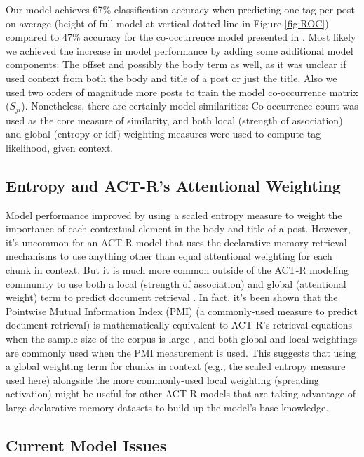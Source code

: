 \documentclass[10pt,letterpaper]{article}
\begin{document}
Our model achieves 67\% classification accuracy when predicting one tag per post on average
(height of full model at vertical dotted line in Figure \ref{fig:ROC})
compared to 47\% accuracy for the co-occurrence model presented in .
Most likely we achieved the increase in model performance by adding some additional model components:
The offset and possibly the body term as well,
as it was unclear if \citeauthor{Kuo2011} used context from both the body and title of a post or just the title.
Also we used two orders of magnitude more posts to train the model co-occurrence matrix ($S_{ji}$).
Nonetheless, there are certainly model similarities:
Co-occurrence count was used as the core measure of similarity, and both local (strength of association) and global (entropy or idf) weighting measures were used to compute tag likelihood, given context.

\subsection{Entropy and ACT-R's Attentional Weighting}

Model performance improved by using a scaled entropy measure to weight the importance of each contextual element in the body and title of a post.
However, it's uncommon for an ACT-R model that uses the declarative memory retrieval mechanisms to use anything other than equal attentional weighting for each chunk in context.
But it is much more common outside of the ACT-R modeling community to use both a local (strength of association) and global (attentional weight) term to predict document retrieval \cite{Dumais1991}.
In fact, it's been shown that the Pointwise Mutual Information Index (PMI) (a commonly-used measure to predict document retrieval)
is mathematically equivalent to ACT-R's retrieval equations when the sample size of the corpus is large \cite{Budiu2007, Farahat2004},
and both global and local weightings are commonly used when the PMI measurement is used.
This suggests that using a global weighting term for chunks in context (e.g., the scaled entropy measure used here)
alongside the more commonly-used local weighting (spreading activation) might be useful for other ACT-R models that are taking advantage of large declarative memory datasets to build up the model's base knowledge.

\subsection{Current Model Issues}
\end{document}
